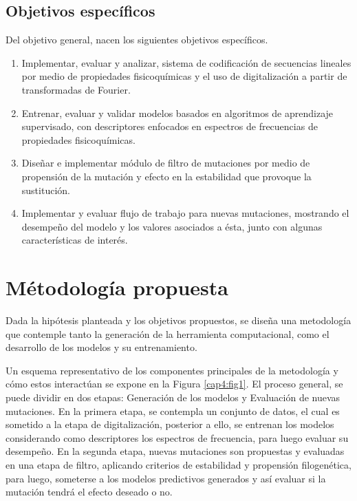 \subsection{Objetivos específicos}

Del objetivo general, nacen los siguientes objetivos específicos.

\begin{enumerate}
	
	\item Implementar, evaluar y analizar, sistema de codificación de secuencias lineales por medio de propiedades fisicoquímicas y el uso de digitalización a partir de transformadas de Fourier.
	\item Entrenar, evaluar y validar modelos basados en algoritmos de aprendizaje supervisado, con descriptores enfocados en espectros de frecuencias de propiedades fisicoquímicas.
	\item Diseñar e implementar módulo de filtro de mutaciones por medio de propensión de la mutación y efecto en la estabilidad que provoque la sustitución.
	\item Implementar y evaluar flujo de trabajo para nuevas mutaciones, mostrando el desempeño del modelo y los valores asociados a ésta, junto con algunas características de interés.
	
\end{enumerate}

\section{Métodología propuesta}

Dada la hipótesis planteada y los objetivos propuestos, se diseña una metodología que contemple tanto la generación de la herramienta computacional, como el desarrollo de los modelos y su entrenamiento.

Un esquema representativo de los componentes principales de la metodología y cómo estos interactúan se expone en la Figura \ref{cap4:fig1}. El proceso general, se puede dividir en dos etapas: Generación de los modelos y Evaluación de nuevas mutaciones. En la primera etapa, se contempla un conjunto de datos, el cual es sometido a la etapa de digitalización, posterior a ello, se entrenan los modelos considerando como descriptores los espectros de frecuencia, para luego evaluar su desempeño. En la segunda etapa, nuevas mutaciones son propuestas y evaluadas en una etapa de filtro, aplicando criterios de estabilidad y propensión filogenética, para luego, someterse a los modelos predictivos generados y así evaluar si la mutación tendrá el efecto deseado o no.


